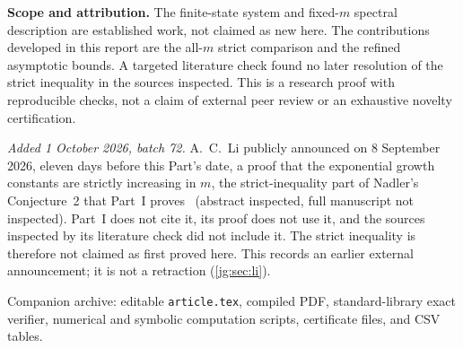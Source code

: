 \documentclass[11pt,a4paper]{article}
\theoremstyle{definition}\newaliascnt{definition}{theorem}
\theoremstyle{remark}\newaliascnt{remark}{theorem}
\begin{document}
\begin{abstract}
\emph{Addition of 30 September 2026 (batch 68).} Part~VI proves
$\mathbb P(M_n\le\lfloor\theta n\rfloor)=\Theta(n^{-\lfloor1/\theta\rfloor/2})$
for every fixed $0<\theta<1$; at $m=n/2$ the order is $n^{-1}$ and it changes
on the scale $\sqrt n$.

\emph{Addition of 1 October 2026 (batch 71).} Part~VII proves
$n\,\mathbb P(M_n\le\lfloor n/2+t\sqrt n\rfloor)\to6+12t_+/\sqrt\pi$ and
$\mathbb P(M_n\le\lfloor\theta n\rfloor)\sim I_3(\theta)/(2\pi n)$ for
$1/3<\theta\le1/2$.

\emph{Addition of 1 October 2026 (batch 72).} Part~VIII finds every fixed
phase amplitude, $\mathbb P(M_n\le\lfloor\theta n\rfloor)\sim
\varkappa_pI_p(\theta)n^{-(p-1)/2}$ for $1/p<\theta<1/(p-1)$, and the
crossover limit $\mathfrak K_r+\mathfrak L_rt_+^{r-1}$ at every $1/r$;
Part~VII's theorems are its first cases.

\emph{Addition of 1 October 2026 (batch 72).} Part~IX, merged from six
manuscripts, takes $m\to\infty$ with $n/m\to\infty$: uniformly for
$n\ge c_0m\log m$, $\log\mathbb P(M_n\le m)=-(n/m)t_m+O(n(\log m)^2/m^2+\log n)$,
with relative equivalents (a saddle sum, a theta modulation, Gamma sums) where
$n(\log m)^2/m^2\to0$.
\end{abstract}
\newpage%
\begin{resultbox}
\textbf{Scope and attribution.}
The finite-state system and fixed-$m$ spectral description are established
work, not claimed as new here. The contributions developed in this report
are the all-$m$ strict comparison and the refined asymptotic bounds. A targeted
literature check found no later resolution of the strict inequality in the
sources inspected. This is a research proof with reproducible checks, not a
claim of external peer review or an exhaustive novelty certification.
\par\smallskip{}\label{jg:rem:li}%
\emph{Added 1 October 2026, batch 72.} A.~C.~Li publicly announced on
8 September 2026, eleven days before this Part's date, a proof that the
exponential growth constants are strictly increasing in $m$, the
strict-inequality part of Nadler's Conjecture~2 that Part~I
proves~\cite{jg:Li} (abstract inspected, full manuscript not inspected).
Part~I does not cite it, its proof does not use it, and the sources inspected
by its literature check did not include it. The strict inequality is therefore
not claimed as first proved here. This records an earlier external
announcement; it is not a retraction (\cref{jg:sec:li}).
\end{resultbox}
\vfill
{\small\sffamily\color{InkGray}Companion archive: editable \texttt{article.tex}, compiled PDF,
standard-library exact verifier, numerical and symbolic computation scripts,
certificate files, and CSV tables.}
\newpage
\tableofcontents
\newpage
{}
\end{document}
